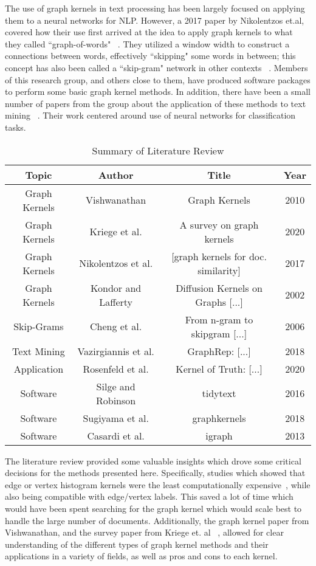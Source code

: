 The use of graph kernels in text processing has been largely focused on applying them to a neural networks for NLP. However, a 2017 paper by Nikolentzos et.al, covered how their use first arrived at the idea to apply graph kernels to what they called ``graph-of-words" ~\cite{nikolentzos2017shortest}. They utilized a window width to construct a connections between words, effectively ``skipping" some words in between; this concept has also been called a ``skip-gram" network in other contexts ~\cite{cheng2006n}. Members of this research group, and others close to them, have produced software packages to perform some basic graph kernel methods. In addition, there have been a small number of papers from the group about the application of these methods to text mining ~\cite{sugiyama2018graphkernels}. Their work centered around use of neural networks for classification tasks. 
\begin{table}[H]
\caption{Summary of Literature Review}
\centering
\begin{tabular}{ c c c c}
\hline
\hline
Topic & Author & Title & Year \\ [0.5ex]
\hline
Graph Kernels & Vishwanathan & Graph Kernels & 2010\\
Graph Kernels & Kriege et al. & A survey on graph kernels & 2020\\
Graph Kernels & Nikolentzos et al. & [graph kernels for doc. similarity] & 2017\\
Graph Kernels & Kondor and Lafferty &  Diffusion Kernels on Graphs [...] & 2002\\
Skip-Grams & Cheng et al. & From n-gram to skipgram [...] & 2006\\
Text Mining & Vazirgiannis et al. & GraphRep: [...] & 2018 \\
Application & Rosenfeld et al. & Kernel of Truth: [...] & 2020\\
Software & Silge and Robinson& tidytext &  2016\\
Software & Sugiyama et al. & graphkernels & 2018 \\
Software & Casardi et al. & igraph & 2013\\
\hline
\end{tabular}
\end{table}

The literature review provided some valuable insights which drove some critical decisions for the methods presented here. Specifically, studies which showed that edge or vertex histogram kernels were the least computationally expensive~\cite{sugiyama2018graphkernels}, while also being compatible with edge/vertex labels. This saved a lot of time which would have been spent searching for the graph kernel which would scale best to handle the large number of documents. Additionally, the graph kernel paper from Vishwanathan, and the survey paper from Kriege et. al ~\cite{kriege2020survey}, allowed for clear understanding of the different types of graph kernel methods and their applications in a variety of fields, as well as pros and cons to each kernel.\\


